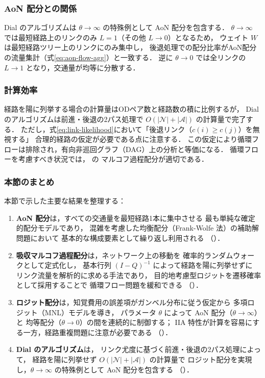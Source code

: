 \subsubsection*{AoN 配分との関係}

Dial のアルゴリズムは $\theta \to \infty$ の特殊例として AoN 配分を包含する．
$\theta \to \infty$ では最短経路上のリンクのみ $L = 1$（その他 $L \to 0$）となるため，
ウェイト $W$ は最短経路ツリー上のリンクにのみ集中し，
後退処理での配分比率がAoN配分の流量集計（式\eqref{eq:aon-flow-agg}）と一致する．
逆に $\theta \to 0$ では全リンクの $L \to 1$ となり，交通量が均等に分散する．

\subsubsection*{計算効率}

経路を陽に列挙する場合の計算量はODペア数と経路数の積に比例するが，
Dial のアルゴリズムは前進・後退の2パス処理で $O(|\mathcal{N}| + |\mathcal{A}|)$ の計算量で完了する\cite{Dial1971}．
ただし，式\eqref{eq:link-likelihood}において「後退リンク（$c(i) \geq c(j)$）を無視する」
合理的経路の仮定が必要である点に注意する．
この仮定により循環フローは排除され，有向非巡回グラフ（DAG）上の分析と等価になる．
循環フローを考慮すべき状況では， の
マルコフ過程配分が適切である\cite{Akamatsu1996}．

\subsubsection*{本節のまとめ}

本節で示した主要な結果を整理する：
\begin{enumerate}
  \item \textbf{AoN 配分}は，すべての交通量を最短経路1本に集中させる
        最も単純な確定的配分モデルであり，
        混雑を考慮した均衡配分（Frank-Wolfe 法）の補助解問題において
        基本的な構成要素として繰り返し利用される
        （）．
  \item \textbf{吸収マルコフ過程配分}は，ネットワーク上の移動を
        確率的ランダムウォークとして定式化し，
        基本行列 $(I-Q)^{-1}$ によって経路を陽に列挙せずに
        リンク流量を解析的に求める手法であり，
        目的地考慮型ロジットを遷移確率として採用することで
        循環フロー問題を緩和できる
        （）．
  \item \textbf{ロジット配分}は，知覚費用の誤差項がガンベル分布に従う仮定から
        多項ロジット（MNL）モデルを導き，
        パラメータ $\theta$ によって AoN 配分（$\theta \to \infty$）と
        均等配分（$\theta \to 0$）の間を連続的に制御する；
        IIA 特性が計算を容易にする一方，経路重複問題に注意が必要である
        （）．
  \item \textbf{Dial のアルゴリズム}は，
        リンク尤度に基づく前進・後退の2パス処理によって，
        経路を陽に列挙せず $O(|\mathcal{N}|+|\mathcal{A}|)$ の計算量で
        ロジット配分を実現し，$\theta \to \infty$ の特殊例として
        AoN 配分を包含する
        （）．
\end{enumerate}
